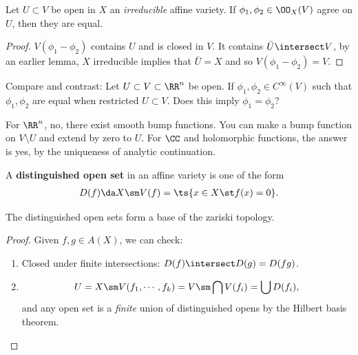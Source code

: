 \begin{proposition}

Let \(U\subset V\) be open in \(X\) an \emph{irreducible} affine
variety. If \(\phi_1, \phi_2 \in \OO_X(V)\) agree on \(U\), then they
are equal.

\end{proposition}

\begin{proof}

\(V(\phi_1 - \phi_2)\) contains \(U\) and is closed in \(V\). It
contains \(\bar U\intersect V\), by an earlier lemma, \(X\) irreducible
implies that \(\bar U = X\) and so \(V(\phi_1 - \phi_2) =V\).

\end{proof}

Compare and contrast: Let \(U\subset V \subset \RR^n\) be open. If
\(\phi_1, \phi_2 \in C^\infty(V)\) such that \(\phi_1, \phi_2\) are
equal when restricted \(U\subset V\). Does this imply
\(\phi_1 = \phi_2\)?

For \(\RR^n\), no, there exist smooth bump functions. You can make a
bump function on \(V\setminus U\) and extend by zero to \(U\). For
\(\CC\) and holomorphic functions, the answer is yes, by the uniqueness
of analytic continuation.

\begin{definition}

A \textbf{distinguished open set} in an affine variety is one of the
form
\begin{align*}  
D(f) \da X\sm V(f) = \ts{x\in X \st f(x) = 0}
.\end{align*}

\end{definition}

\begin{proposition}

The distinguished open sets form a base of the zariski topology.

\end{proposition}

\begin{proof}

Given \(f, g\in A(X)\), we can check:

\begin{enumerate}
\def\labelenumi{\arabic{enumi}.}
\tightlist
\item
  Closed under finite intersections: \(D(f) \intersect D(g) = D(fg)\).
\item

  \begin{align*}U = X\sm V(f_1, \cdots, f_k) = V\sm \bigcap V(f_i) = \bigcup D(f_i),\end{align*}
  and any open set is a \emph{finite} union of distinguished opens by
  the Hilbert basis theorem.
\end{enumerate}

\end{proof}

